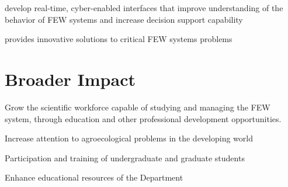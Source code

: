 develop real-time, cyber-enabled interfaces that improve understanding of the behavior of FEW systems and increase decision support capability

provides innovative solutions to critical FEW systems problems


\section{Broader Impact}
Grow the scientific workforce capable of studying and managing the FEW system, through education and other professional development opportunities.


Increase attention to agroecological problems in the developing world


Participation and training of undergraduate and graduate students


Enhance educational resources of the Department
